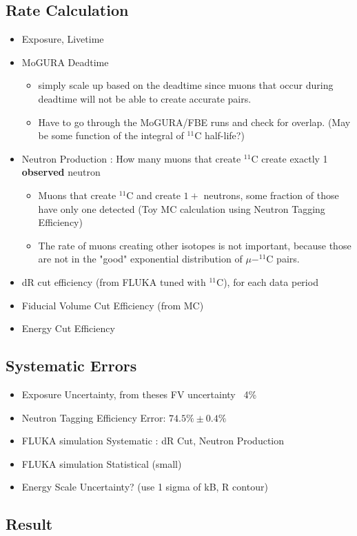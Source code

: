 \documentclass[12pt,letterpaper]{article}
\begin{document}
\subsection*{Rate Calculation}
\begin{itemize}
	\item Exposure, Livetime
	\item MoGURA Deadtime 
	\begin{itemize}
		\item simply scale up based on the deadtime since muons that occur during deadtime will not be able to create accurate pairs.
		\item Have to go through the MoGURA/FBE runs and check for overlap. (May be some function of the integral of $^{11}$C half-life?)
	\end{itemize}
	\item Neutron Production : How many muons that create $^{11}$C create exactly 1 \textbf{observed} neutron
	\begin{itemize}
		\item Muons that create $^{11}$C and create $1+$ neutrons, some fraction of those have only one detected (Toy MC calculation using Neutron Tagging Efficiency)
		\item The rate of muons creating other isotopes is not important, because those are not in the "good" exponential distribution of $\mu-^{11}$C pairs.
	\end{itemize}
	\item dR cut efficiency (from FLUKA tuned with $^{11}$C), for each data period\
	\item Fiducial Volume Cut Efficiency (from MC)
	\item Energy Cut Efficiency
\end{itemize}

\subsection*{Systematic Errors}
\begin{itemize}
	\item Exposure Uncertainty, from theses FV uncertainty ~4\%
	\item Neutron Tagging Efficiency Error: $74.5\%\pm0.4\%$
	\item FLUKA simulation Systematic : dR Cut, Neutron Production
	\item FLUKA simulation Statistical (small)
	\item Energy Scale Uncertainty? (use 1 sigma of kB, R contour)
\end{itemize}

\subsection*{Result}
\end{document}
